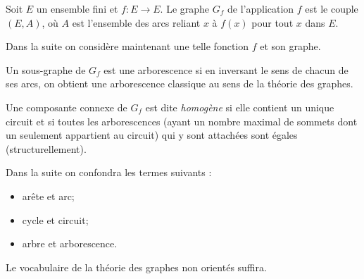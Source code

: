 \begin{definition}
Soit $E$ un ensemble fini et $f:E\rightarrow E$. Le graphe $G_f$ de l'application $f$ est le couple $(E, A)$, o\`u $A$ est l'ensemble des arcs reliant $x$ \`a $f(x)$ pour tout $x$ dans $E$.
\end{definition}

Dans la suite on consid\`ere maintenant une telle fonction $f$ et son graphe.

\begin{definition}[arborescence]
Un sous-graphe de $G_f$ est une arborescence si en inversant le sens de chacun de ses arcs, on obtient une arborescence classique au sens de la th\'eorie des graphes.
\end{definition}

\begin{definition}
Une composante connexe de $G_f$ est dite \emph{homog\`ene} si elle contient un unique circuit et si toutes les arborescences (ayant un nombre maximal de sommets dont un seulement appartient au circuit) qui y sont attach\'ees sont \'egales (structurellement).
\end{definition}

\begin{rem}
Dans la suite on confondra les termes suivants :
\begin{itemize}
\item ar\^ete et arc;
\item cycle et circuit;
\item arbre et arborescence.
\end{itemize}
Le vocabulaire de la th\'eorie des graphes non orient\'es suffira.
\end{rem}